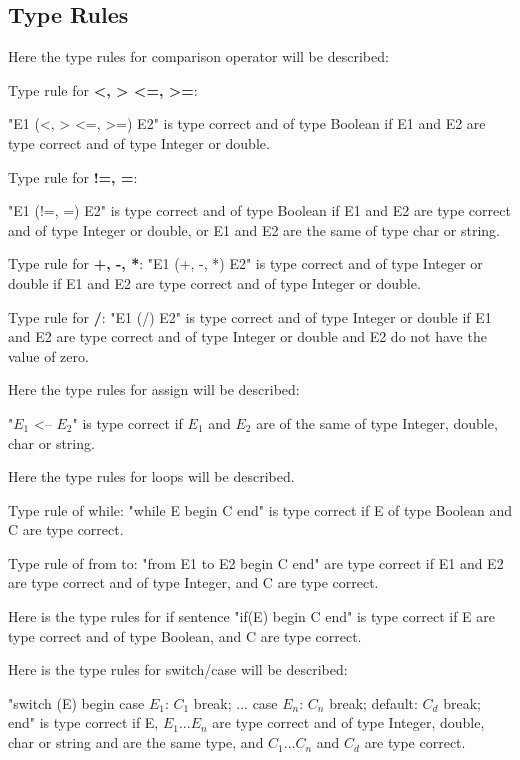 \subsection{Type Rules}
Here the type rules for comparison operator will be described:

Type rule for \textbf{<, > <=, >=}:

"E1 (<, > <=, >=) E2" is type correct and of type Boolean if E1 and E2 are type correct and of type Integer or double.

Type rule for \textbf{!=, =}:

"E1 (!=, =) E2" is type correct and of type Boolean if E1 and E2 are type correct and of type Integer or double, or E1 and E2 are the same of type char or string.

Type rule for \textbf{+, -, *}:
"E1 (+, -, *) E2" is type correct and of type Integer or double if E1 and E2 are type correct and of type Integer or double.

Type rule for \textbf{/}:
"E1 (/) E2" is type correct and of type Integer or double if E1 and E2 are type correct and of type Integer or double and E2 do not have the value of zero.

Here the type rules for assign will be described:

"$E_1$ <-- $E_2$" is type correct if $E_1$ and $E_2$ are of the same of type Integer, double, char or string.

Here the type rules for loops will be described.

Type rule of while: 
"while E begin C end" is type correct if E of type Boolean and C are type correct.

Type rule of from to: 
"from E1 to E2 begin C end" are type correct if E1 and E2 are type correct and of type Integer, and C are type correct.

Here is the type rules for if sentence
"if(E) begin C end" is type correct if E are type correct and of type Boolean, and C are type correct.

Here is the type rules for switch/case will be described:

"switch (E) begin case $E_1$: $C_1$ break; ... case $E_n$: $C_n$ break; default: $C_d$ break; end" is type correct if E, $E_1$...$E_n$ are type correct and of type Integer, double, char or string and are the same type, and $C_1$...$C_n$ and $C_d$ are type correct.